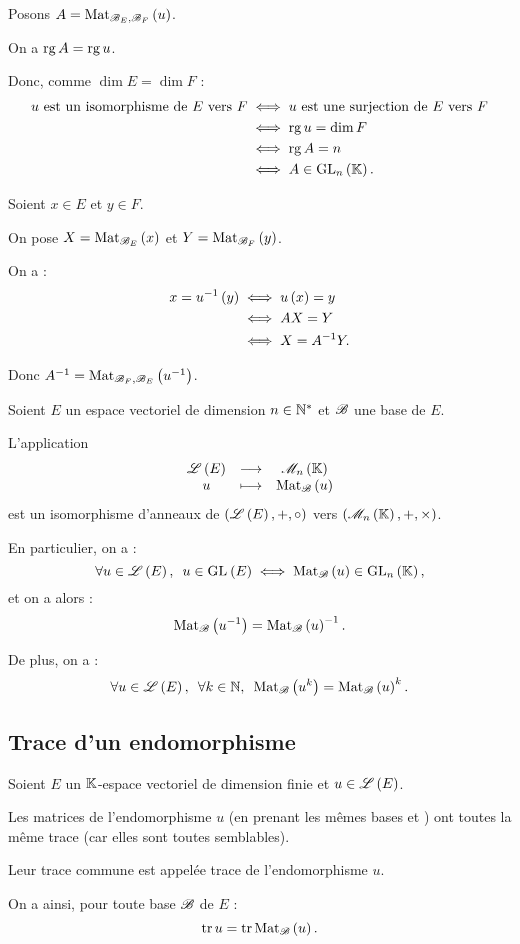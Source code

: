\begin{dem}
Posons \(A=\Mat[\fami{B}_E,\fami{B}_F]{u}\).

On a \(\operatorname{rg} A=\operatorname{rg} u\).

Donc, comme \(\dim E=\dim F\) : \[\begin{aligned}
u\text{ est un isomorphisme de }E\text{ vers }F&\ssi u\text{ est une surjection de }E\text{ vers }F \\
&\ssi\rg u=\dim F \\
&\ssi\rg A=n \\
&\ssi A\in\GL{n}.
\end{aligned}\]

Soient \(x\in E\) et \(y\in F\).

On pose \(X=\Mat[\fami{B}_E]{x}\) et \(Y=\Mat[\fami{B}_F]{y}\).

On a : \[\begin{aligned}
x=u^{-1}\left(y\right)&\iff u\left(x\right)=y \\
&\iff AX=Y \\
&\iff X=A^{-1} Y.
\end{aligned}\]

Donc \(A\inv=\Mat[\fami{B}_F,\fami{B}_E]{u\inv}\).
\end{dem}

\begin{prop}
Soient \(E\) un espace vectoriel de dimension \(n\in\mathbb{N}^*\) et \(\mathscr{B}\) une base de \(E\).

L'application \[\fonctionlambda{\Lendo{E}}{\M{n}}{u}{\Mat{u}}\] est un isomorphisme d'anneaux de \(\anneau{\Lendo{E}}[+][\rond]\) vers \(\anneau{\M{n}}\).

En particulier, on a : \[\quantifs{\forall u\in\Lendo{E}}u\in\GL{}[E]\ssi\Mat{u}\in\GL{n},\] et on a alors : \[\Mat{u\inv}=\Mat{u}\inv.\]

De plus, on a : \[\quantifs{\forall u\in\Lendo{E};\forall k\in\N}\Mat{u^k}=\Mat{u}^k.\]
\end{prop}

\subsection{Trace d'un endomorphisme}

\begin{defprop}
Soient \(E\) un \(\mathbb{K}\)-espace vectoriel de dimension finie et \(u\in\mathscr{L}\left(E\right)\).

Les matrices de l'endomorphisme \(u\) (en prenant les mêmes bases  et ) ont toutes la même trace (car elles sont toutes semblables).

Leur trace commune est appelée trace de l'endomorphisme \(u\).

On a ainsi, pour toute base \(\mathscr{B}\) de \(E\) : \[\tr u=\tr\Mat{u}.\]
\end{defprop}

